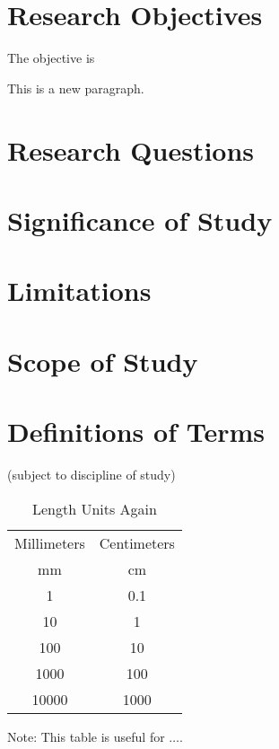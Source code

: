 \section{Research Objectives}
The objective is 

This is a new paragraph.


\section{Research Questions}

\section{Significance of Study}

\section{Limitations}

\section{Scope of Study}

\section{Definitions of Terms}
(subject to discipline of study)

\begin{table}[ht]
    \caption{Length Units Again}
    \begin{tabular}{cc}
        \toprule %
        Millimeters & Centimeters\\
        mm          &   cm\\
        \midrule
        1           &   0.1\\
        10          &   1\\
        100         &   10\\
        1000        &   100\\
        10000       &   1000\\
        \bottomrule
    \end{tabular}
    \par\raggedright Note: This table is useful for $\ldots$.
    \label{table:lengthunitsa}
\end{table}
